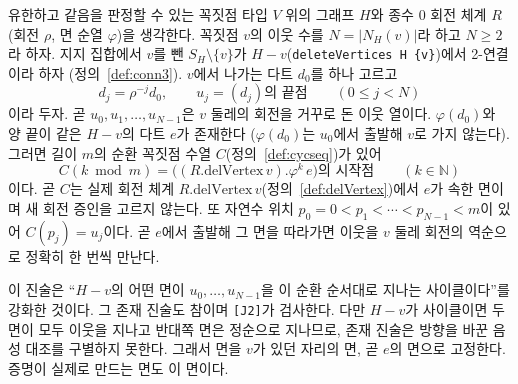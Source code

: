 \begin{lemma}
\label{lem:J2}
\leanok
유한하고 같음을 판정할 수 있는 꼭짓점 타입 \(V\) 위의 그래프 \(H\)와 종수 0 회전 체계 \(R\)(회전 \(\rho\),
면 순열 \(\varphi\))을 생각한다. 꼭짓점 \(v\)의 이웃 수를 \(N = |N_H(v)|\)라 하고 \(N \ge 2\)라 하자.
지지 집합에서 \(v\)를 뺀 \(S_H \setminus \{v\}\)가 \(H - v\)(\texttt{deleteVertices H \{v\}})에서
2-연결이라 하자 (정의~\ref{def:conn3}). \(v\)에서 나가는 다트 \(d_0\)를 하나 고르고
\[
  d_j = \rho^{-j} d_0, \qquad u_j = (d_j)\text{의 끝점} \qquad (0 \le j < N)
\]
이라 두자. 곧 \(u_0, u_1, \ldots, u_{N-1}\)은 \(v\) 둘레의 회전을 거꾸로 돈 이웃 열이다.
\(\varphi(d_0)\)와 양 끝이 같은 \(H - v\)의 다트 \(e\)가 존재한다 (\(\varphi(d_0)\)는 \(u_0\)에서 출발해 \(v\)로 가지 않는다).
그러면 길이 \(m\)의 순환 꼭짓점 수열 \(C\)(정의~\ref{def:cycseq})가 있어
\[
  C(k\bmod m) = \bigl((R.\mathrm{delVertex}\,v).\varphi^{k}\, e\bigr)\text{의 시작점} \qquad (k \in \mathbb{N})
\]
이다. 곧 \(C\)는 실제 회전 체계 \(R.\mathrm{delVertex}\,v\)(정의~\ref{def:delVertex})에서 \(e\)가 속한 면이며
새 회전 증인을 고르지 않는다. 또 자연수 위치 \(p_0 = 0 < p_1 < \cdots < p_{N-1} < m\)이 있어
\(C(p_j) = u_j\)이다. 곧 \(e\)에서 출발해 그 면을 따라가면 이웃을 \(v\) 둘레 회전의 역순으로 정확히 한 번씩 만난다.

이 진술은 ``\(H - v\)의 어떤 면이 \(u_0, \ldots, u_{N-1}\)을 이 순환 순서대로 지나는 사이클이다''를 강화한 것이다.
그 존재 진술도 참이며 \texttt{[J2]}가 검사한다. 다만 \(H - v\)가 사이클이면 두 면이 모두 이웃을 지나고
반대쪽 면은 정순으로 지나므로, 존재 진술은 방향을 바꾼 음성 대조를 구별하지 못한다. 그래서 면을 \(v\)가
있던 자리의 면, 곧 \(e\)의 면으로 고정한다. 증명이 실제로 만드는 면도 이 면이다.


\end{lemma}
